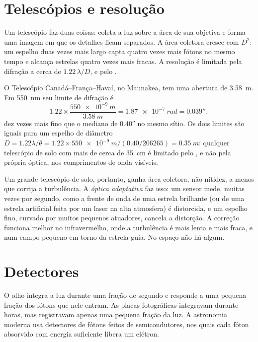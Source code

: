 \section{Telescópios e resolução}

Um telescópio faz duas coisas: coleta a luz sobre a área de sua objetiva e forma uma imagem em que os detalhes ficam separados. A área coletora cresce com $D^2$: um espelho duas vezes mais largo capta quatro vezes mais fótons no mesmo tempo e alcança estrelas quatro vezes mais fracas. A resolução é limitada pela difração a cerca de $1.22\,\lambda/D$, e pelo .

\begin{example}
O Telescópio Canadá--França--Havaí, no Maunakea, tem uma abertura de
\qty{3.58}{m}. Em \qty{550}{nm} seu limite de difração é
\[
  1.22\times\frac{\qty{550e-9}{m}}{\qty{3.58}{m}} = \qty{1.87e-7}{rad}
  = \ang{;;0.039},
\]
dez vezes mais fino que o  mediano de \ang{;;0.40} no mesmo sítio. Os dois limites são iguais para um espelho de diâmetro $D = 1.22\lambda/\theta =
1.22\times\qty{550e-9}{m}/(\num{0.40}/\num{206265}) = \qty{0.35}{m}$: qualquer telescópio de solo com mais de cerca de \qty{35}{cm} é limitado pelo , e não pela própria óptica, nos comprimentos de onda visíveis.
\end{example}

Um grande telescópio de solo, portanto, ganha área coletora, não nitidez, a menos que corrija a turbulência. A \emph{óptica adaptativa} faz isso: um sensor mede, muitas vezes por segundo, como a frente de onda de uma estrela brilhante (ou de uma estrela artificial feita por um laser na alta atmosfera) é distorcida, e um espelho fino, curvado por muitos pequenos atuadores, cancela a distorção. A correção funciona melhor no infravermelho, onde a turbulência é mais lenta e mais fraca, e num campo pequeno em torno da estrela-guia. No espaço não há  algum.

\section{Detectores}

O olho integra a luz durante uma fração de segundo e responde a uma pequena fração dos fótons que nele entram. As placas fotográficas integravam durante horas, mas registravam apenas uma pequena fração da luz. A astronomia moderna usa detectores de fótons feitos de semicondutores, nos quais cada fóton absorvido com energia suficiente libera um elétron.


